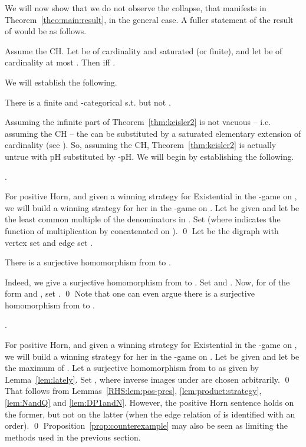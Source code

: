 \documentclass{LMCS}
\begin{document}
We will now show that we do not observe the  collapse, that manifests in Theorem~\ref{theo:main:result}, in the general case. A fuller statement of the result of \cite{Keisler65} would be as follows.
\begin{thm}
\label{thm:keisler2}
Assume the CH. Let  be of cardinality  and saturated (or finite), and let  be of cardinality at most . Then  iff .
\end{thm}
\noindent We will establish the following.
\begin{prop}
\label{prop:counterexample}
There is a finite  and -categorical  s.t.  but not .
\end{prop}
\noindent Assuming the infinite part of Theorem~\ref{thm:keisler2} is not vacuous -- i.e. assuming the CH -- the  can be substituted by a saturated elementary extension of cardinality  (see \cite{Marker}). So, assuming the CH, Theorem~\ref{thm:keisler2} is actually untrue with pH substituted by -pH. We will begin by establishing the following.
\begin{lem}
\label{lem:NandQ}
.
\end{lem}
\proof
For  positive Horn, and given a winning strategy  for Existential in the -game on , we will build a winning strategy  for her in the -game on . Let  be given and let  be the least common multiple of the denominators in .
Set  (where  indicates the function of multiplication by  concatenated on ).
\qed
\noindent Let  be the digraph with vertex set  and edge set .
\begin{lem}
\label{lem:lately}
There is a surjective homomorphism  from  to .
\end{lem}
\proof
Indeed, we give a surjective homomorphism from  to . Set   and . Now, for  of the form  and , set .
\qed
\noindent Note that one can even argue there is a surjective homomorphism from  to .
\begin{lem}
\label{lem:DP1andN}
.
\end{lem}
\proof
For  positive Horn, and given a winning strategy  for Existential in the -game on , we will build a winning strategy  for her in the -game on . Let  be given and let  be the maximum of . Let  a surjective homomorphism  from  to  as given by Lemma~\ref{lem:lately}.
Set , where inverse images under  are chosen arbitrarily.
\qed
{}
That  follows from Lemmas~\ref{RHS:lem:pos-pres}, \ref{lem:product:strategy}, \ref{lem:NandQ} and \ref{lem:DP1andN}. However, the positive Horn sentence  holds on the former, but not on the latter (when the edge relation of  is identified with an order).
\qed
\noindent Proposition~\ref{prop:counterexample} may also be seen as limiting the methods used in the previous section.
\end{document}
